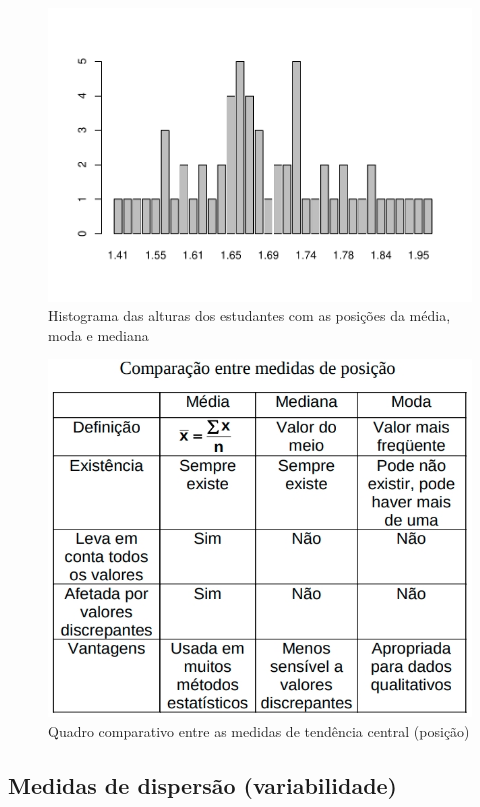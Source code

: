 \documentclass[
]{book}
\begin{document}
\begin{figure}

{\centering \includegraphics{apostila_files/figure-latex/unnamed-chunk-42-1} 

}

\caption{Histograma das alturas dos estudantes com as posições da média, moda e mediana}\label{fig:unnamed-chunk-42}
\end{figure}

\begin{figure}

{\centering \includegraphics[width=0.5\linewidth]{images3/comp_sinteses} 

}

\caption{Quadro comparativo entre as medidas de tendência central (posição)}\label{fig:unnamed-chunk-43}
\end{figure}

\hypertarget{medidas-de-dispersuxe3o-variabilidade}{%
\subsection{Medidas de dispersão (variabilidade)}\label{medidas-de-dispersuxe3o-variabilidade}}
\end{document}
